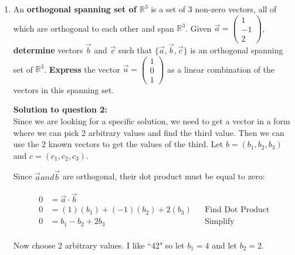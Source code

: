 \documentclass[12pt]{book}
\begin{document}
\begin{enumerate}

\newpage

\item An \textbf{orthogonal spanning set of $\mathbb{R}^3$} is a set of 3 non-zero vectors, all of which are orthogonal to each other and span $\mathbb{R}^3$. Given $\vec{a} = \left(\begin{smallmatrix} 1 \\ -1 \\ 2 \end{smallmatrix}\right)$, \textbf{determine} vectors $\vec{b}$ and $\vec{c}$ such that $\{\vec{a}, \vec{b}, \vec{c}\}$ is an orthogonal spanning set of $\mathbb{R}^3$. \textbf{Express} the vector $\vec{u}= \left(\begin{smallmatrix} 1 \\ 0 \\ 1 \end{smallmatrix}\right)$ as a linear combination of the vectors in this spanning set. 

\vspace{0.3cm} 
\textbf{Solution to question 2:}\\
 Since we are looking for a specific solution, we need to get a vector
 in a form where we can pick 2 arbitrary values and find the third value. Then we 
 can use the 2 known vectors to get the values of the third. 
 Let $b = (b_1, b_2, b_3)$ and $c = (c_1, c_2, c_3)$.

 Since $\vec{a} and \vec{b}$ are orthogonal, their dot product must be equal to zero:
 \vspace{-0.5cm}

 \addtolength{\jot}{0.3em}
 \begin{align*}
  0 &= \vec{a} \cdot \vec{b} \\
  0 &= (1)(b_1) + (-1)(b_2) + 2(b_3) && \text{Find Dot Product} \\
  0 &= b_1 - b_2 + 2b_3 && \text{Simplify} \\
 \end{align*}

 \vspace{-1cm}
 Now choose 2 arbitrary values. I like ``42" so let $b_1 = 4$ and let $b_2 = 2$. 


\end{enumerate}
\end{document}
